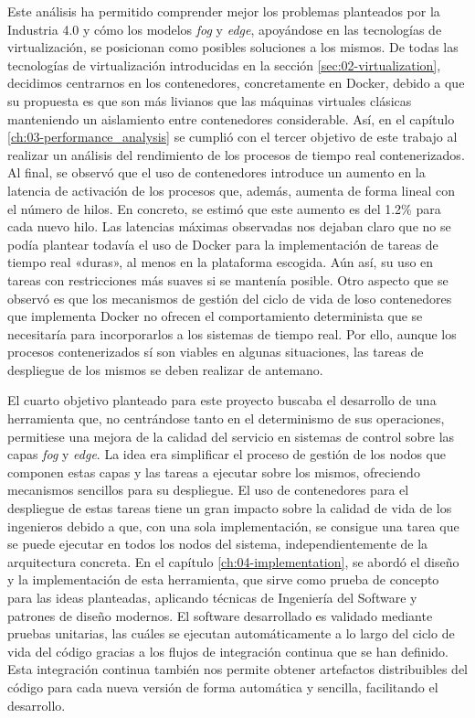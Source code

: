 Este análisis ha permitido comprender mejor los problemas planteados por la
Industria 4.0 y cómo los modelos \textit{fog} y \textit{edge}, apoyándose en las
tecnologías de virtualización, se posicionan como posibles soluciones a los
mismos. De todas las tecnologías de virtualización introducidas en la sección
\ref{sec:02-virtualization}, decidimos centrarnos en los contenedores,
concretamente en Docker, debido a que su propuesta es que son más livianos que
las máquinas virtuales clásicas manteniendo un aislamiento entre contenedores
considerable. Así, en el capítulo \ref{ch:03-performance_analysis} se cumplió
con el tercer objetivo de este trabajo al realizar un análisis del rendimiento
de los procesos de tiempo real contenerizados. Al final, se observó que el uso
de contenedores introduce un aumento en la latencia de activación de los
procesos que, además, aumenta de forma lineal con el número de hilos. En
concreto, se estimó que este aumento es del 1.2\% para cada nuevo hilo. Las
latencias máximas observadas nos dejaban claro que no se podía plantear todavía
el uso de Docker para la implementación de tareas de tiempo real «duras», al
menos en la plataforma escogida. Aún así, su uso en tareas con restricciones más
suaves si se mantenía posible. Otro aspecto que se observó es que los mecanismos
de gestión del ciclo de vida de loso contenedores que implementa Docker no
ofrecen el comportamiento determinista que se necesitaría para incorporarlos a
los sistemas de tiempo real. Por ello, aunque los procesos contenerizados sí son
viables en algunas situaciones, las tareas de despliegue de los mismos se deben
realizar de antemano.

El cuarto objetivo planteado para este proyecto buscaba el desarrollo de una
herramienta que, no centrándose tanto en el determinismo de sus operaciones,
permitiese una mejora de la calidad del servicio en sistemas de control sobre
las capas \textit{fog} y \textit{edge}. La idea era simplificar el proceso de
gestión de los nodos que componen estas capas y las tareas a ejecutar sobre los
mismos, ofreciendo mecanismos sencillos para su despliegue. El uso de
contenedores para el despliegue de estas tareas tiene un gran impacto sobre la
calidad de vida de los ingenieros debido a que, con una sola implementación, se
consigue una tarea que se puede ejecutar en todos los nodos del sistema,
independientemente de la arquitectura concreta. En el capítulo
\ref{ch:04-implementation}, se abordó el diseño y la implementación de esta
herramienta, que sirve como prueba de concepto para las ideas planteadas,
aplicando técnicas de Ingeniería del Software y patrones de diseño modernos. El
software desarrollado es validado mediante pruebas unitarias, las cuáles se
ejecutan automáticamente a lo largo del ciclo de vida del código gracias a los
flujos de integración continua que se han definido. Esta integración continua
también nos permite obtener artefactos distribuibles del código para cada nueva
versión de forma automática y sencilla, facilitando el desarrollo.

